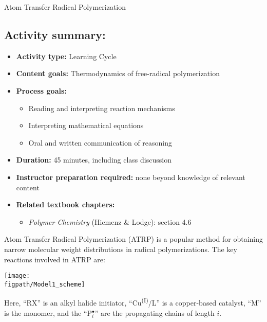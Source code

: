 \begin{activity}{Atom Transfer Radical Polymerization}
\begin{instructornotes}
	\subsection*{Activity summary:}
	\begin{itemize}
		\item \textbf{Activity type:} Learning Cycle
		\item \textbf{Content goals:} Thermodynamics of free-radical polymerization
		\item \textbf{Process goals:} %
			\begin{itemize}
				\item Reading and interpreting reaction mechanisms
				\item Interpreting mathematical equations
				\item Oral and written communication of reasoning
			\end{itemize}
		\item \textbf{Duration:} 45 minutes, including class discussion
		\item \textbf{Instructor preparation required:} none beyond knowledge of relevant content
		\item \textbf{Related textbook chapters:}
			\begin{itemize}
				\item \emph{Polymer Chemistry} (Hiemenz \& Lodge): section 4.6
			\end{itemize}
	\end{itemize}
	
\end{instructornotes}


\begin{model}
	\label{\labelbase:mdl:ATRPrxns}

	Atom Transfer Radical Polymerization (ATRP) is a popular method for obtaining narrow molecular weight distributions in radical polymerizations.  The key reactions involved in ATRP are:
	
	\centerline{\texttt{[image: \\figpath/Model1\_scheme]}}
	
	Here, ``RX'' is an alkyl halide initiator, ``Cu\textsuperscript{(I)}/L'' is a copper-based catalyst, ``M'' is the monomer, and the ``P$_i^\bullet$'' are the propagating chains of length $i$.
	

\end{model}
\end{activity}

